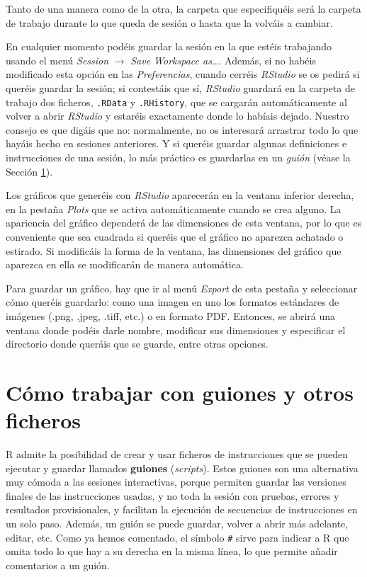 \documentclass[]{book}
\theoremstyle{definition}
\theoremstyle{definition}
\theoremstyle{definition}
\theoremstyle{remark}
\begin{document}
Tanto de una manera como de la otra, la carpeta que especifiquéis será la carpeta de trabajo durante lo que queda de sesión o hasta que la volváis a cambiar.

En cualquier momento podéis guardar la sesión en la que estéis trabajando usando el menú \emph{Session} \(\rightarrow\) \emph{Save Workspace as\ldots{}}.
Además, si no habéis modificado esta opción en las \emph{Preferencias}, cuando cerréis \emph{RStudio} se os pedirá si queréis guardar la sesión; si contestáis que sí, \emph{RStudio} guardará en la carpeta de trabajo dos ficheros, \texttt{.RData} y \texttt{.RHistory}, que se cargarán automáticamente al volver a abrir \emph{RStudio} y estaréis exactamente donde lo habíais dejado. Nuestro consejo es que digáis que no: normalmente, no os interesará arrastrar todo lo que hayáis hecho en sesiones anteriores. Y si queréis guardar algunas definiciones e instrucciones de una sesión, lo más práctico es guardarlas en un \emph{guión} (véase la Sección \ref{sec:guiones}).

Los gráficos que generéis con \emph{RStudio} aparecerán en la ventana inferior derecha, en la pestaña \emph{Plots} que se activa automáticamente cuando se crea alguno. La apariencia del gráfico dependerá de las dimensiones de esta ventana, por lo que es conveniente que sea cuadrada si queréis que el gráfico no aparezca achatado o estirado. Si modificáis la forma de la ventana, las dimensiones del gráfico que aparezca en ella se modificarán de manera automática.

Para guardar un gráfico, hay que ir al menú \emph{Export} de esta pestaña y seleccionar cómo queréis guardarlo: como una imagen en uno los formatos estándares de imágenes (.png, .jpeg, .tiff, etc.) o en formato PDF. Entonces, se abrirá una ventana donde podéis darle nombre, modificar sus dimensiones y especificar el directorio donde queráis que se guarde, entre otras opciones.

\hypertarget{sec:guiones}{%
\section{Cómo trabajar con guiones y otros ficheros}\label{sec:guiones}}

R admite la posibilidad de crear y usar ficheros de instrucciones que se pueden ejecutar y guardar llamados \textbf{guiones} (\emph{scripts}). Estos guiones son una alternativa muy cómoda a las sesiones interactivas, porque permiten guardar las versiones finales de las instrucciones usadas, y no toda la sesión con pruebas, errores y resultados provisionales, y facilitan la ejecución de secuencias de instrucciones en un solo paso. Además, un guión se puede guardar, volver a abrir más adelante, editar, etc. Como ya hemos comentado, el símbolo \texttt{\#} sirve para indicar a R que omita todo lo que hay a su derecha en la misma línea, lo que permite añadir comentarios a un guión.
\end{document}
